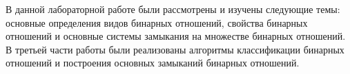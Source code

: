 \documentclass[bachelor, och, labwork]{shiza}
\begin{document}
	\newpage
	\conclusion %
	
	В данной лабораторной работе были рассмотрены и изучены следующие темы: основные определения видов бинарных отношений, свойства бинарных отношений и основные системы замыкания на множестве бинарных отношений. В третьей части работы были реализованы алгоритмы классификации бинарных отношений и построения основных замыканий бинарных отношений.
	
	
\end{document}
